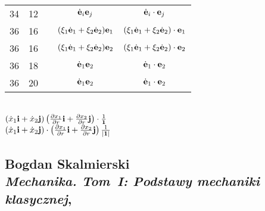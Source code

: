 \documentclass[a4paper,11pt]{article}
\numberwithin{equation}{section}
\begin{document}
\begin{center}
\begin{tabular}{|c|c|c|c|c|}
    34  & 12 & & $\dot{ \mathbf{e} }_{ i } \mathbf{e}_{ j }$
           & $\dot{ \mathbf{e} }_{ i } \cdot \mathbf{e}_{ j }$ \\
    36  & 16 & & $( \xi_{ 1 } \dot{ \mathbf{e} }_{ 1 }
                 + \xi_{ 2 } \dot{ \mathbf{e} }_{ 2 }  ) \mathbf{e}_{ 1 }$
           & $( \xi_{ 1 } \dot{ \mathbf{e} }_{ 1 }
             + \xi_{ 2 } \dot{ \mathbf{e} }_{ 2 }  ) \cdot \mathbf{e}_{ 1 }$ \\
    36  & 16 & & $( \xi_{ 1 } \dot{ \mathbf{e} }_{ 1 }
                 + \xi_{ 2 } \dot{ \mathbf{e} }_{ 2 }  ) \mathbf{e}_{ 2 }$
           & $( \xi_{ 1 } \dot{ \mathbf{e} }_{ 1 }
             + \xi_{ 2 } \dot{ \mathbf{e} }_{ 2 }  ) \cdot \mathbf{e}_{ 2 }$ \\
    36  & 18 & & $\dot{ \mathbf{e} }_{ 1 } \mathbf{e}_{ 2 }$
           & $\dot{ \mathbf{e} }_{ 1 } \cdot \mathbf{e}_{ 2 }$ \\
    36  & 20 & & $\dot{ \mathbf{e} }_{ 1 } \mathbf{e}_{ 2 }$
           & $\dot{ \mathbf{e} }_{ 1 } \cdot \mathbf{e}_{ 2 }$ \\
    \hline
  \end{tabular}

\end{center}

\VerSpaceTwo


\noindent
{} \\[0.3em]
\Jest
$( \dot{ x }_{ 1 } \mathbf{i} + \dot{ x }_{ 2 } \mathbf{j} )
\left( \frac{ \partial x_{ 1 } }{ \partial r } \mathbf{i}
  + \frac{ \partial x_{ 2 } }{ \partial r } \mathbf{j} \right)
\cdot \frac{ 1 }{ \mathbf{1} }$ \\[0.5em]
\Powin
$( \dot{ x }_{ 1 } \mathbf{i} + \dot{ x }_{ 2 } \mathbf{j} )
\cdot \left( \frac{ \partial x_{ 1 } }{ \partial r } \mathbf{i}
  + \frac{ \partial x_{ 2 } }{ \partial r } \mathbf{j} \right)
\frac{ 1 }{ | \mathbf{1} | }$ \\













\newpage

\subsection{ %
  Bogdan Skalmierski \\
  \textit{Mechanika. Tom~I: Podstawy mechaniki klasycznej},
  \cite{SkalmierskiMechanikPodstawyETCVolI1998}}
\end{document}
